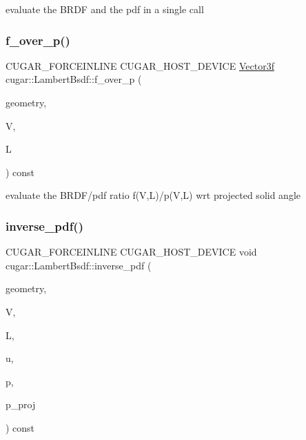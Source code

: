 evaluate the B\+R\+DF and the pdf in a single call \mbox{\label{structcugar_1_1_lambert_bsdf_a5e22f75a67105055c6b0aaf3103c17ef}} 
\subsubsection{\texorpdfstring{f\+\_\+over\+\_\+p()}{f\_over\_p()}}
{\footnotesize\ttfamily C\+U\+G\+A\+R\+\_\+\+F\+O\+R\+C\+E\+I\+N\+L\+I\+NE C\+U\+G\+A\+R\+\_\+\+H\+O\+S\+T\+\_\+\+D\+E\+V\+I\+CE \hyperlink{structcugar_1_1_vector}{Vector3f} cugar\+::\+Lambert\+Bsdf\+::f\+\_\+over\+\_\+p (\begin{DoxyParamCaption}\item[{const \hyperlink{structcugar_1_1_differential_geometry}{Differential\+Geometry} \&}]{geometry,  }\item[{const \hyperlink{structcugar_1_1_vector}{Vector3f}}]{V,  }\item[{const \hyperlink{structcugar_1_1_vector}{Vector3f}}]{L }\end{DoxyParamCaption}) const\hspace{0.3cm}{\ttfamily [inline]}}

evaluate the B\+R\+D\+F/pdf ratio f(\+V,\+L)/p(V,L) wrt projected solid angle \mbox{\label{structcugar_1_1_lambert_bsdf_acefc82404f7abc7d41e5d5263f5c9ef3}} 
\subsubsection{\texorpdfstring{inverse\+\_\+pdf()}{inverse\_pdf()}}
{\footnotesize\ttfamily C\+U\+G\+A\+R\+\_\+\+F\+O\+R\+C\+E\+I\+N\+L\+I\+NE C\+U\+G\+A\+R\+\_\+\+H\+O\+S\+T\+\_\+\+D\+E\+V\+I\+CE void cugar\+::\+Lambert\+Bsdf\+::inverse\+\_\+pdf (\begin{DoxyParamCaption}\item[{const \hyperlink{structcugar_1_1_differential_geometry}{Differential\+Geometry} \&}]{geometry,  }\item[{const \hyperlink{structcugar_1_1_vector}{Vector3f}}]{V,  }\item[{const \hyperlink{structcugar_1_1_vector}{Vector3f}}]{L,  }\item[{const \hyperlink{structcugar_1_1_vector}{Vector3f}}]{u,  }\item[{float \&}]{p,  }\item[{float \&}]{p\+\_\+proj }\end{DoxyParamCaption}) const\hspace{0.3cm}{\ttfamily [inline]}}

